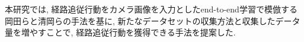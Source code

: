 
本研究では, 経路追従行動をカメラ画像を入力としたend-to-end学習で模倣する岡田ら\cite{okada-si2020}と清岡ら\cite{kiyooka-si}の手法を基に, 新たなデータセットの収集方法と収集したデータ量を増やすことで, 経路追従行動を獲得できる手法を提案した. 